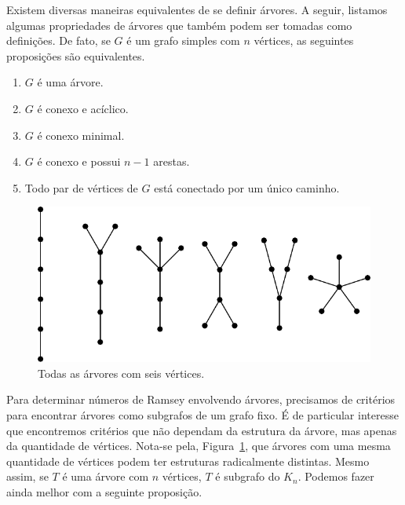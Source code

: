 Existem diversas maneiras equivalentes de se definir árvores. A seguir, listamos algumas propriedades de árvores que também podem ser tomadas como definições. De fato, se $G$ é um grafo simples com $n$ vértices, as seguintes proposições são equivalentes.

\begin{enumerate}[label=\arabic*.,itemindent=*]
  \item $G$ é uma árvore.
  \item $G$ é conexo e acíclico.
  \item $G$ é conexo minimal.
  \item $G$ é conexo e possui $n-1$ arestas.
  \item Todo par de vértices de $G$ está conectado por um único caminho.
\end{enumerate}

\begin{figure}[ht!]
\centering
\includegraphics{figures/3_graph_5_tree6}
\caption{Todas as árvores com seis vértices.}
\label{graph:fig:tree6}
\end{figure}

Para determinar números de Ramsey envolvendo árvores, precisamos de critérios para encontrar árvores como subgrafos de um grafo fixo. É de particular interesse que encontremos critérios que não dependam da estrutura da árvore, mas apenas da quantidade de vértices. Nota-se pela, Figura~\ref{graph:fig:tree6}, que árvores com uma mesma quantidade de vértices podem ter estruturas radicalmente distintas. Mesmo assim, se $T$ é uma árvore com $n$ vértices, $T$ é subgrafo do $K_n$. Podemos fazer ainda melhor com a seguinte proposição.

